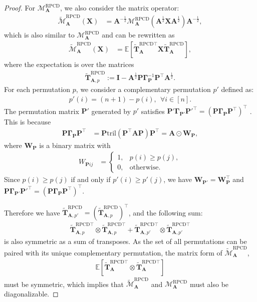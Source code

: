 \documentclass{article}
\theoremstyle{plain}
\theoremstyle{definition}
\theoremstyle{remark}
\def\bigopen#1{\left(#1\right)}
\def\bigclosed#1{\left[#1\right]}
\newcommand{\tril}{\mathrm{tril}}
\newcommand{\mGamma}{\bm{\Gamma}}
\newcommand{\RPCD}{\text{RPCD}} %
\newcommand{\MARPCD}{\mathcal{M}_{\bm{A}}^{\RPCD}} %
\def\mA{{\bm{A}}}
\def\mI{{\bm{I}}}
\def\mP{{\bm{P}}}
\def\mT{{\bm{T}}}
\def\mW{{\bm{W}}}
\def\mX{{\bm{X}}}
\def\gM{{\mathcal{M}}}
\newcommand{\E}{\mathbb{E}}
\begin{document}
\begin{proof}
    For $\MARPCD$, we also consider the matrix operator:
    \begin{align*}
        \widetilde{\gM}_{\mA}^{\RPCD} (\mX) &= \mA^{-\frac12} \MARPCD (\mA^{\frac12} \mX \mA^{\frac12}) \mA^{-\frac12},
    \end{align*}
    which is also similar to $\MARPCD$ and can be rewritten as
    \begin{align*}
        \widetilde{\gM}_{\mA}^{\RPCD} (\mX) &= \E \bigclosed{\widetilde{\mT}_{\mA}^{\RPCD \top} \mX \widetilde{\mT}_{\mA}^{\RPCD}},
    \end{align*}
    where the expectation is over the matrices
    \begin{align*}
        \widetilde{\mT}_{\mA, p}^{\RPCD} := \mI - \mA^{\frac12} \mP \mGamma_{\mP}^{-1} \mP^{\top} \mA^{\frac12}.
    \end{align*}
    For each permutation $p$, we consider a complementary permutation $p'$ defined as:
    \begin{align*}
        p'(i) = (n+1) - p(i), \ \ \forall i \in [n].
    \end{align*}
    The permutation matrix $\mP'$ generated by $p'$ satisfies $\mP' \mGamma_{\mP'} \mP'^{\top} = \bigopen{\mP \mGamma_{\mP} \mP^{\top}}^{\top}$ \citep{sun20}.
    This is because
    \begin{align*}
        \mP \mGamma_{\mP} \mP^{\top} &= \mP \tril(\mP^{\top} \mA \mP) \mP^{\top} = \mA \odot \mW_{\mP},
    \end{align*}
    where $\mW_{\mP}$ is a binary matrix with
    \begin{align*}
        W_{\mP ij} &= \begin{cases}
            1, & p(i) \ge p(j), \\
            0, & \text{otherwise.}
        \end{cases}
    \end{align*}
    Since $p(i) \ge p(j)$ if and only if $p'(i) \ge p'(j)$, we have $\mW_{\mP'} = \mW_{\mP}^{\top}$ and $\mP \mGamma_{\mP'} \mP'^{\top} = \bigopen{\mP \mGamma_{\mP} \mP^{\top}}^{\top}$.
    
    Therefore we have $\widetilde{\mT}_{\mA, p'}^{\RPCD} = (\widetilde{\mT}_{\mA, p}^{\RPCD})^{\top}$, and the following sum:
    \begin{align*}
        \widetilde{\mT}_{\mA, p}^{\RPCD \top} \otimes \widetilde{\mT}_{\mA, p}^{\RPCD \top} + \widetilde{\mT}_{\mA, p'}^{\RPCD \top} \otimes \widetilde{\mT}_{\mA, p'}^{\RPCD \top}
    \end{align*}
    is also symmetric as a sum of transposes.
    As the set of all permutations can be paired with its unique complementary permutation, the matrix form of $\widetilde{\gM}_{\mA}^{\RPCD}$,
    \begin{align*}        
        \E \bigclosed{\widetilde{\mT}_{\mA}^{\RPCD \top} \otimes \widetilde{\mT}_{\mA}^{\RPCD \top}}
    \end{align*}
    must be symmetric, which implies that $\widetilde{\gM}_{\mA}^{\RPCD}$ and $\MARPCD$ must also be diagonalizable.
\end{proof}
\end{document}
